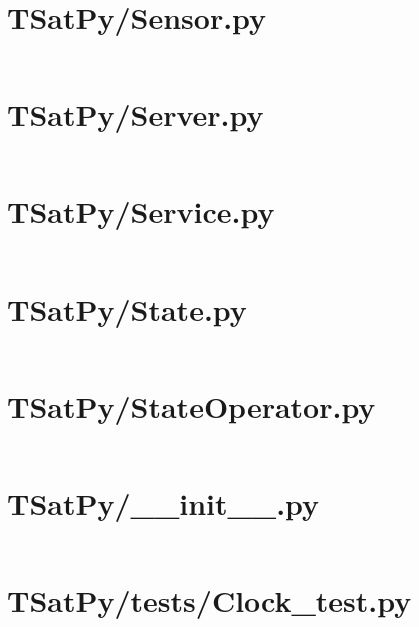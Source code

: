 \pagebreak
\section*{TSatPy/Sensor.py}\label{code:TSatPy/Sensor.py}\inputminted[linenos,fontsize=\scriptsize]{python}{/home/dcouture/git/mathyourlife/TSatPy/TSatPy/Sensor.py}

\pagebreak
\section*{TSatPy/Server.py}\label{code:TSatPy/Server.py}\inputminted[linenos,fontsize=\scriptsize]{python}{/home/dcouture/git/mathyourlife/TSatPy/TSatPy/Server.py}

\pagebreak
\section*{TSatPy/Service.py}\label{code:TSatPy/Service.py}\inputminted[linenos,fontsize=\scriptsize]{python}{/home/dcouture/git/mathyourlife/TSatPy/TSatPy/Service.py}

\pagebreak
\section*{TSatPy/State.py}\label{code:TSatPy/State.py}\inputminted[linenos,fontsize=\scriptsize]{python}{/home/dcouture/git/mathyourlife/TSatPy/TSatPy/State.py}

\pagebreak
\section*{TSatPy/StateOperator.py}\label{code:TSatPy/StateOperator.py}\inputminted[linenos,fontsize=\scriptsize]{python}{/home/dcouture/git/mathyourlife/TSatPy/TSatPy/StateOperator.py}

\pagebreak
\section*{TSatPy/\_\_init\_\_.py}\label{code:TSatPy/__init__.py}\inputminted[linenos,fontsize=\scriptsize]{python}{/home/dcouture/git/mathyourlife/TSatPy/TSatPy/__init__.py}

\pagebreak
\section*{TSatPy/tests/Clock\_test.py}\label{code:TSatPy/tests/Clock_test.py}
\inputminted[linenos,fontsize=\scriptsize]{python}{/home/dcouture/git/mathyourlife/TSatPy/TSatPy/tests/Clock_test.py}


